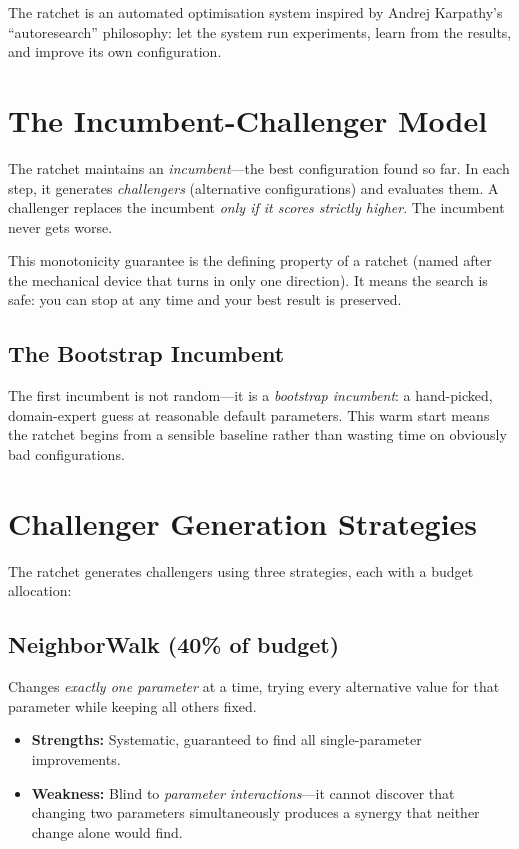 \documentclass[11pt,a4paper,twoside]{report}
\theoremstyle{definition}
\begin{document}
The ratchet is an automated optimisation system inspired by Andrej
Karpathy's ``autoresearch'' philosophy: let the system run experiments,
learn from the results, and improve its own configuration.

\section{The Incumbent-Challenger Model}

\begin{concept}[title={The Ratchet Guarantee}]
The ratchet maintains an \emph{incumbent}---the best configuration found
so far. In each step, it generates \emph{challengers} (alternative
configurations) and evaluates them. A challenger replaces the incumbent
\emph{only if it scores strictly higher}. The incumbent never gets
worse.
\end{concept}

This monotonicity guarantee is the defining property of a ratchet (named
after the mechanical device that turns in only one direction). It means
the search is safe: you can stop at any time and your best result is
preserved.

\subsection{The Bootstrap Incumbent}

The first incumbent is not random---it is a \emph{bootstrap
incumbent}: a hand-picked, domain-expert guess at reasonable default
parameters. This warm start means the ratchet begins from a sensible
baseline rather than wasting time on obviously bad configurations.

\section{Challenger Generation Strategies}
\label{sec:strategies}

The ratchet generates challengers using three strategies, each with a
budget allocation:

\subsection{NeighborWalk (40\% of budget)}

Changes \emph{exactly one parameter} at a time, trying every alternative
value for that parameter while keeping all others fixed.

\begin{itemize}
  \item \textbf{Strengths:} Systematic, guaranteed to find all
        single-parameter improvements.
  \item \textbf{Weakness:} Blind to \emph{parameter interactions}---it
        cannot discover that changing two parameters simultaneously
        produces a synergy that neither change alone would find.
\end{itemize}
\end{document}

